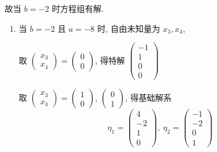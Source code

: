          故当 \( b = -2 \) 时方程组有解.
         \begin{enumerate}[label=\textcircled{\small \arabic*}]
             \item
                   当 \( b = -2 \) 且 \( a = -8 \) 时, 自由未知量为 \( x_{3}, x_{4} \),

                   取 \( \begin{pmatrix}
                       x_{3} \\
                       x_{4}
                   \end{pmatrix} = \begin{pmatrix}
                       0 \\
                       0
                   \end{pmatrix} \), 得特解 \( \begin{pmatrix}
                       -1 \\
                       1  \\
                       0  \\
                       0
                   \end{pmatrix} \)

                   取 \( \begin{pmatrix}
                       x_{3} \\
                       x_{4}
                   \end{pmatrix} = \begin{pmatrix}
                       1 \\
                       0
                   \end{pmatrix} \), \( \begin{pmatrix}
                       0 \\
                       1
                   \end{pmatrix} \), 得基础解系
                   \[ \eta_{1} = \begin{pmatrix}
                           4  \\
                           -2 \\
                           1  \\
                           0
                       \end{pmatrix}, \  \eta_{2} = \begin{pmatrix}
                           -1 \\
                           -2 \\
                           0  \\
                           1
                       \end{pmatrix} \]


\end{enumerate}

